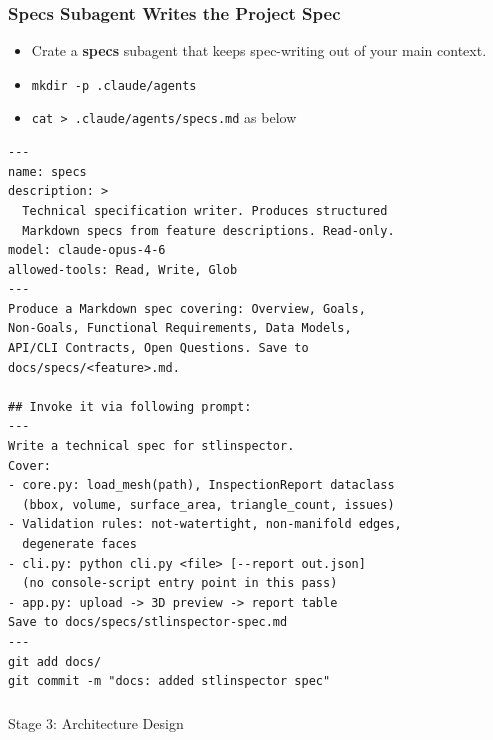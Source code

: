 \begin{frame}[fragile]\frametitle{Specs Subagent Writes the Project Spec}

  \begin{itemize}
	\item Crate a \textbf{specs} subagent that keeps spec-writing out of your main context.
    \item \lstinline|mkdir -p .claude/agents|
    \item \lstinline|cat > .claude/agents/specs.md| as below
  \end{itemize}

\begin{lstlisting}
---
name: specs
description: >
  Technical specification writer. Produces structured
  Markdown specs from feature descriptions. Read-only.
model: claude-opus-4-6
allowed-tools: Read, Write, Glob
---
Produce a Markdown spec covering: Overview, Goals,
Non-Goals, Functional Requirements, Data Models,
API/CLI Contracts, Open Questions. Save to
docs/specs/<feature>.md.

## Invoke it via following prompt:
---
Write a technical spec for stlinspector. 
Cover:
- core.py: load_mesh(path), InspectionReport dataclass
  (bbox, volume, surface_area, triangle_count, issues)
- Validation rules: not-watertight, non-manifold edges,
  degenerate faces
- cli.py: python cli.py <file> [--report out.json]
  (no console-script entry point in this pass)
- app.py: upload -> 3D preview -> report table
Save to docs/specs/stlinspector-spec.md
---
git add docs/
git commit -m "docs: added stlinspector spec"
\end{lstlisting}
\end{frame}


\begin{frame}[fragile]\frametitle{}
\begin{center}
{\Large Stage 3: Architecture Design}
\end{center}
\end{frame}


